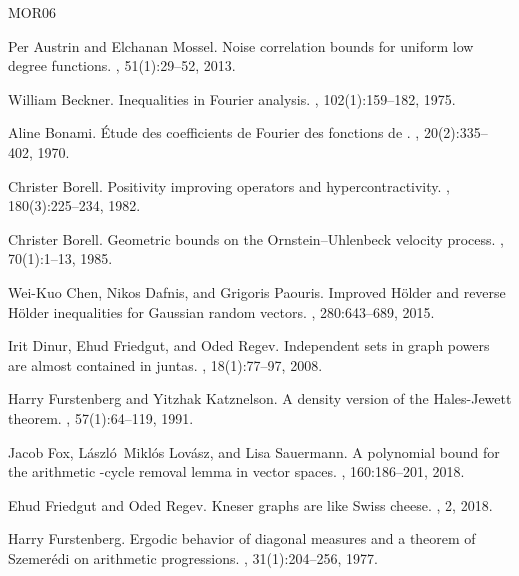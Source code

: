 \documentclass{daj}
\newcommand{\1}{\mathbbm{1}}
\theoremstyle{plain}
\theoremstyle{definition}
\begin{document}

\newcommand{\etalchar}[1]{}
\begin{thebibliography}{MOR{\etalchar{+}}06}

Per Austrin and Elchanan Mossel.
\newblock Noise correlation bounds for uniform low degree functions.
, 51(1):29--52, 2013.

William Beckner.
\newblock Inequalities in {F}ourier analysis.
, 102(1):159--182, 1975.

Aline Bonami.
\newblock Étude des coefficients de {F}ourier des fonctions de {}.
, 20(2):335--402, 1970.

Christer Borell.
\newblock Positivity improving operators and hypercontractivity.
, 180(3):225--234, 1982.

Christer Borell.
\newblock Geometric bounds on the {Ornstein--Uhlenbeck} velocity process.
, 70(1):1--13, 1985.

{Wei-Kuo} Chen, Nikos Dafnis, and Grigoris Paouris.
\newblock Improved {H}ölder and reverse {H}ölder inequalities for {G}aussian
  random vectors.
, 280:643--689, 2015.

Irit Dinur, Ehud Friedgut, and Oded Regev.
\newblock Independent sets in graph powers are almost contained in juntas.
, 18(1):77--97, 2008.

Harry Furstenberg and Yitzhak Katznelson.
\newblock A density version of the {H}ales-{J}ewett theorem.
, 57(1):64--119, 1991.

Jacob Fox, László~Miklós Lovász, and Lisa Sauermann.
\newblock A polynomial bound for the arithmetic {}-cycle removal lemma in
  vector spaces.
, 160:186--201, 2018.

Ehud Friedgut and Oded Regev.
\newblock Kneser graphs are like {S}wiss cheese.
, 2, 2018.

Harry Furstenberg.
\newblock Ergodic behavior of diagonal measures and a theorem of {S}zemerédi
  on arithmetic progressions.
, 31(1):204--256, 1977.


\end{thebibliography}
\end{document}

